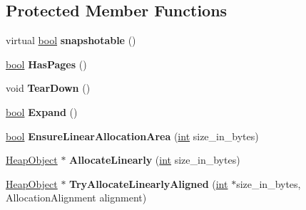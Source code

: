 \subsection*{Protected Member Functions}
\begin{DoxyCompactItemize}
\item 
\mbox{\label{classv8_1_1internal_1_1PagedSpace_aeb0dd24b678bc4f2f70b54e86de0cd66}} 
virtual \mbox{\hyperlink{classbool}{bool}} {\bfseries snapshotable} ()
\item 
\mbox{\label{classv8_1_1internal_1_1PagedSpace_ae922e0aa9f3dec8c7b3f3c86d78340a2}} 
\mbox{\hyperlink{classbool}{bool}} {\bfseries Has\+Pages} ()
\item 
\mbox{\label{classv8_1_1internal_1_1PagedSpace_aff48f83009c4b8429f3e3263d2b3da32}} 
void {\bfseries Tear\+Down} ()
\item 
\mbox{\label{classv8_1_1internal_1_1PagedSpace_a72b12619f3f5da63cf74e17043a9a294}} 
\mbox{\hyperlink{classbool}{bool}} {\bfseries Expand} ()
\item 
\mbox{\label{classv8_1_1internal_1_1PagedSpace_a3e1aa954ebd619696f7f4a6d41eb53d3}} 
\mbox{\hyperlink{classbool}{bool}} {\bfseries Ensure\+Linear\+Allocation\+Area} (\mbox{\hyperlink{classint}{int}} size\+\_\+in\+\_\+bytes)
\item 
\mbox{\label{classv8_1_1internal_1_1PagedSpace_a4f721427d9246676c4d3223df775c815}} 
\mbox{\hyperlink{classv8_1_1internal_1_1HeapObject}{Heap\+Object}} $\ast$ {\bfseries Allocate\+Linearly} (\mbox{\hyperlink{classint}{int}} size\+\_\+in\+\_\+bytes)
\item 
\mbox{\label{classv8_1_1internal_1_1PagedSpace_ad06a7cbfdd136ef441a4ed19a9a06f89}} 
\mbox{\hyperlink{classv8_1_1internal_1_1HeapObject}{Heap\+Object}} $\ast$ {\bfseries Try\+Allocate\+Linearly\+Aligned} (\mbox{\hyperlink{classint}{int}} $\ast$size\+\_\+in\+\_\+bytes, Allocation\+Alignment alignment)
\item 
\mbox{\label{classv8_1_1internal_1_1PagedSpace_a0a5dc5519a48a999db321aae3c032a89}} 

\end{DoxyCompactItemize}

